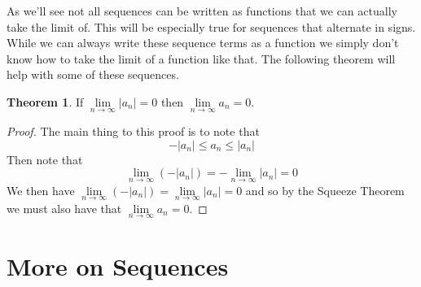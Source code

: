 \documentclass[10pt,reqno]{book}
\theoremstyle{definition}
\newtheorem{theorem}{Theorem}[section]
\begin{document}
	\noindent As we'll see not all sequences can be written as functions that we can actually take the limit of. This will be especially true for sequences that alternate in signs. While we can always write these sequence terms as a function we simply don’t know how to take the limit of a function like that. The following theorem will help with some of these sequences.
	\begin{theorem}
		If $ \lim\limits_{n \to \infty} |a_n| = 0 $ then $ \lim\limits_{n \to \infty} a_n = 0 $.
	\end{theorem}
	\begin{proof}
		The main thing to this proof is to note that 
		\[ -|a_n| \leq a_n \leq |a_n| \]
		Then note that
		\[ \lim\limits_{n \to \infty} (-|a_n|) = - \lim\limits_{n \to \infty} |a_n| = 0 \]
		We then have $ \lim\limits_{n \to \infty} (-|a_n|) = \lim\limits_{n \to \infty} |a_n| = 0 $ and so by the Squeeze Theorem we must also have that $ \lim\limits_{n \to \infty} a_n = 0 $.
	\end{proof}
	
	\section{More on Sequences}
	
\end{document}
